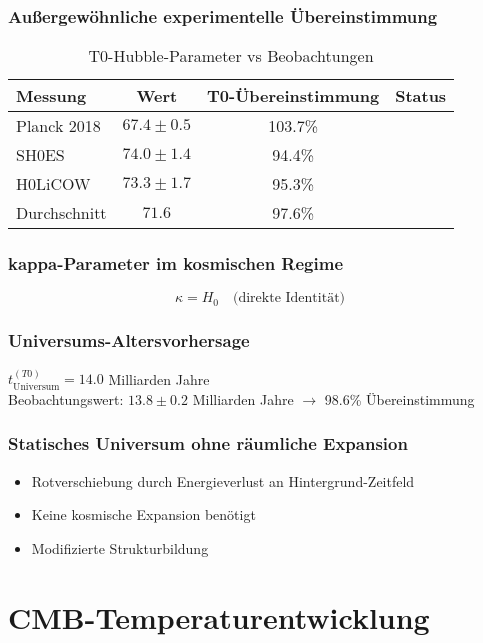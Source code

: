 \documentclass[12pt,a4paper]{report}
\begin{document}
	\subsubsection{Außergewöhnliche experimentelle Übereinstimmung}
	\begin{table}[h]
		\centering
		\begin{tabular}{lccc}
			\toprule
			\textbf{Messung} & \textbf{Wert} & \textbf{T0-Übereinstimmung} & \textbf{Status} \\
			\midrule
			Planck 2018 & $67.4 \pm 0.5$ & 103.7\% & \checkmark \\
			SH0ES & $74.0 \pm 1.4$ & 94.4\% & \checkmark \\
			H0LiCOW & $73.3 \pm 1.7$ & 95.3\% & \checkmark \\
			Durchschnitt & $71.6$ & 97.6\% & \checkmark \\
			\bottomrule
		\end{tabular}
		\caption{T0-Hubble-Parameter vs Beobachtungen}
		\label{tab:hubble-comparison}
	\end{table}
	
	\subsubsection{kappa-Parameter im kosmischen Regime}
	$$\kappa = H_0 \quad \text{(direkte Identität)}$$
	
	\subsubsection{Universums-Altersvorhersage}
	$t_{\text{Universum}}^{(T0)} = 14.0$ Milliarden Jahre\\
	Beobachtungswert: $13.8 \pm 0.2$ Milliarden Jahre $\rightarrow$ 98.6\% Übereinstimmung
	
	\subsubsection{Statisches Universum ohne räumliche Expansion}
	\begin{itemize}
		\item Rotverschiebung durch Energieverlust an Hintergrund-Zeitfeld
		\item Keine kosmische Expansion benötigt
		\item Modifizierte Strukturbildung
	\end{itemize}
	
	\section{CMB-Temperaturentwicklung}
\end{document}
